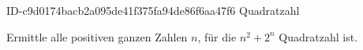 \begin{exercise}
      {ID-c9d0174bacb2a095de41f375fa94de86f6aa47f6}
      {Quadratzahl}
  \ifproblem\problem\par
    Ermittle alle positiven ganzen Zahlen $n$, für die $n^{2}+2^{n}$
    Quadratzahl ist.
  \fi
\end{exercise}
